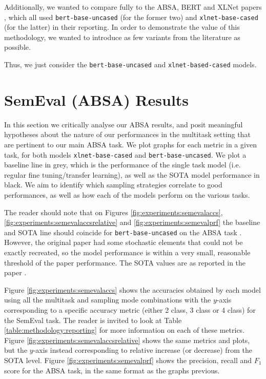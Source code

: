 Additionally, we wanted to compare fully to the ABSA, BERT and XLNet papers \cite{Sun2019, Devlin2018, Yang2019}, which all used \texttt{bert-base-uncased} (for the former two) and \texttt{xlnet-base-cased} (for the latter) in their reporting. In order to demonstrate the value of this methodology, we wanted to introduce as few variants from the literature as possible.

Thus, we just consider the \texttt{bert-base-uncased} and \texttt{xlnet-based-cased} models.
\section{SemEval (ABSA) Results}
In this section we critically analyse our ABSA results, and posit meaningful hypotheses about the nature of our performances in the multitask setting that are pertinent to our main ABSA task. We plot graphs for each metric in a given task, for both models \texttt{xlnet-base-cased} and \texttt{bert-base-uncased}. We plot a baseline line in grey, which is the performance of the single task model (i.e. regular fine tuning/transfer learning), as well as the SOTA model performance in black. We aim to identify which sampling strategies correlate to good performances, as well as how each of the models perform on the various tasks.

The reader should note that on Figures \ref{fig:experiments:semevalaccs}, \ref{fig:experiments:semevalaccsrelative} and \ref{fig:experiments:semevalprf} the baseline and SOTA line should coincide for \texttt{bert-base-uncased} on the ABSA task . However, the original paper had some stochastic elements that could not be exactly recreated, so the model performance is within a very small, reasonable threshold of the paper performance. The SOTA values are as reported in the paper \cite{Sun2019}.

Figure \ref{fig:experiments:semevalaccs} shows the accuracies obtained by each model using all the multitask and sampling mode combinations with the $y$-axis corresponding to a specific accuracy metric (either 2 class, 3 class or 4 class) for the SemEval task. The reader is invited to look at Table \ref{table:methodology:reporting} for more information on each of these metrics. Figure \ref{fig:experiments:semevalaccsrelative} shows the same metrics and plots, but the $y$-axis instead corresponding to relative increase (or decrease) from the SOTA level. Figure \ref{fig:experiments:semevalprf} shows the precision, recall and $F_1$ score for the ABSA task, in the same format as the graphs previous.

